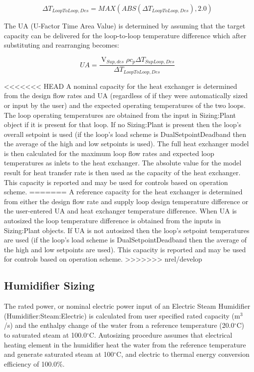 \begin{equation}
\Delta {T_{LoopToLoop,Des}} = MAX\left( {ABS\left( {\Delta {T_{LoopToLoop,Des}}} \right),2.0} \right)
\end{equation}

The UA (U-Factor Time Area Value) is determined by assuming that the target capacity can be delivered for the loop-to-loop temperature difference which after substituting and rearranging becomes:

\begin{equation}
UA = \frac{{{{\mathop {V}\limits }_{Sup,des}}\rho {c_p}\Delta {T_{SupLoop,Des}}}}{{\Delta {T_{LoopToLoop,Des}}}}
\end{equation}

<<<<<<< HEAD
A nominal capacity for the heat exchanger is determined from the design flow rates and UA (regardless of if they were automatically sized or input by the user) and the expected operating temperatures of the two loops. The loop operating temperatures are obtained from the input in Sizing:Plant object if it is present for that loop. If no Sizing:Plant is present then the loop's overall setpoint is used (if the loop's load scheme is DualSetpointDeadband then the average of the high and low setpoints is used). The full heat exchanger model is then calculated for the maximum loop flow rates and expected loop temperatures as inlets to the heat exchanger. The absolute value for the model result for heat transfer rate is then used as the capacity of the heat exchanger. This capacity is reported and may be used for controls based on operation scheme.
=======
A reference capacity for the heat exchanger is determined from either the design flow rate and supply loop design temperature difference or the user-entered UA and heat exchanger temperature difference. When UA is autosized the loop temperature difference is obtained from the inputs in Sizing:Plant objects. If UA is not autosized then the loop's setpoint temperatures are used (if the loop's load scheme is DualSetpointDeadband then the average of the high and low setpoints are used). This capacity is reported and may be used for controls based on operation scheme.
>>>>>>> nrel/develop

\subsection{Humidifier Sizing}\label{humidifier-sizing}

The rated power, or nominal electric power input of an Electric Steam Humidifier (Humidifier:Steam:Electric) is calculated from user specified rated capacity (m\(^{3}\)/s) and the enthalpy change of the water from a reference temperature (20.0\(^{\circ}\)C) to saturated steam at 100.0\(^{\circ}\)C. Autosizing procedure assumes that electrical heating element in the humidifier heat the water from the reference temperature and generate saturated steam at 100\(^{\circ}\)C, and electric to thermal energy conversion efficiency of 100.0\%.


